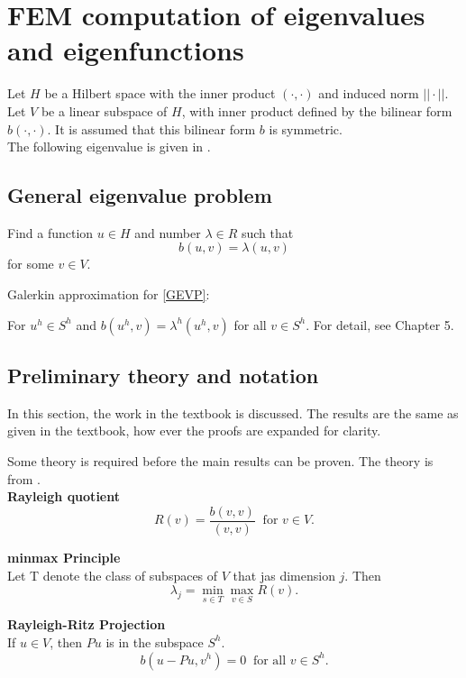 \documentclass[../../main.tex]{subfiles}
\begin{document}
\section{FEM computation of eigenvalues and eigenfunctions}


Let $H$ be a Hilbert space with the inner product $(\cdot,\cdot)$ and induced norm $||\cdot||$. Let $V$ be a linear subspace of $H$, with inner product defined by the bilinear form $b(\cdot,\cdot)$. It is assumed that this bilinear form $b$ is symmetric.\\

The following eigenvalue is given in \cite{SF73}.

\subsection{General eigenvalue problem}
Find a function $u \in H$ and number $\lambda \in R$ such that
\begin{equation}
	b(u,v) = \lambda (u,v) \label{GEVP}
\end{equation} for some $v \in V$.

Galerkin approximation for \eqref{GEVP}:

For $u^h \in S^h$ and $b(u^h, v) = \lambda^h(u^h,v)$ for all $v \in S^h$. For detail, see Chapter 5.

\subsection{Preliminary theory and notation}
In this section, the work in the textbook \cite[p.228-236]{SF73} is discussed. The results are the same as given in the textbook, how ever the proofs are expanded for clarity.

Some theory is required before the main results can be proven. The theory is from \cite{SF73}.\\

\textbf{Rayleigh quotient}
\begin{equation*}
	R(v) = \frac{b(v,v)}{(v,v)} \ \text { for } v \in V.
\end{equation*} \label{sym:Rayleigh}

\textbf{minmax Principle}\\
Let T denote the class of subspaces of $V$ that jas dimension $j$. Then
\begin{equation*}
	\lambda_j = \min_{s\in T}\max_{v \in S} R(v).
\end{equation*}

\textbf{Rayleigh-Ritz Projection}\\
If $u \in V$, then $Pu$ is in the subspace $S^h$.
\begin{equation*}
	b(u-Pu,v^h) = 0 \ \text{ for all } v \in S^h.
\end{equation*}
\end{document}
